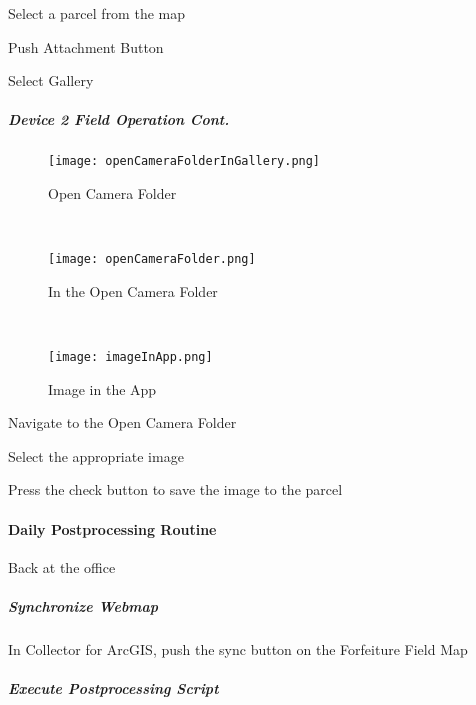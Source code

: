 \documentclass[class=book , crop=false, titlepage, twoside, multi={itemize, figure, verbatim}, float=false]{standalone}
\begin{document}
\vspace{.4in}

Select a parcel from the map
\vspace{2in}

\noindent Push Attachment Button
\vspace{2in}

\noindent Select Gallery

\clearpage
%
%
%
\subparagraph*{Device 2 Field Operation Cont.\texorpdfstring{\\}{}}
%
%
\begin{wrapfigure}{r}{0.4\textwidth}
\centering
\texttt{[image: openCameraFolderInGallery.png]}
\caption {Open Camera Folder}
\vspace{.1in}

\HRule \\[.4cm] %
\vspace{.1in}

\texttt{[image: openCameraFolder.png]}
\caption{In the Open Camera Folder}
\vspace{.1in}

\HRule \\[.4cm] %
\vspace{.1in}

\texttt{[image: imageInApp.png]}
\caption{Image in the App}
\end{wrapfigure}
Navigate to the Open Camera Folder
\vspace{2in}

\noindent Select the appropriate image
\vspace{2in}

\noindent Press the check button to save the image to the parcel

\clearpage
%
%
%
\paragraph[Daily Postprocessing Routine]{Daily Postprocessing Routine\texorpdfstring{\\}{}}

Back at the office
\subparagraph[Synchronize Webmap]{Synchronize Webmap\texorpdfstring{\\}{}}

In Collector for ArcGIS, push the sync button on the Forfeiture Field Map
\subparagraph[Execute Postprocessing Script]{Execute Postprocessing Script\texorpdfstring{\\}{}}
\end{document}
